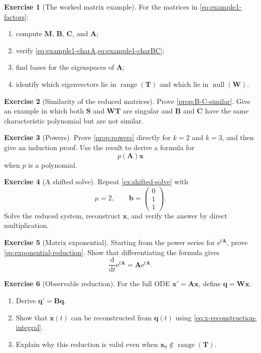 \documentclass[11pt]{article}
\newcommand{\mat}[1]{\mathbf{#1}}
\newcommand{\vect}[1]{\mathbf{#1}}
\newcommand{\range}{\operatorname{range}}
\newcommand{\nullsp}{\operatorname{null}}
\newcommand{\e}{\mathrm{e}}
\newcommand{\dd}{\mathrm{d}}
\theoremstyle{definition}
\newtheorem{exercise}{Exercise}[section]
\theoremstyle{remark}
\begin{document}
\begin{exercise}[The worked matrix example]
\label{ex:verify-worked}
For the matrices in \cref{eq:example1-factors}:
\begin{enumerate}[label=(\alph*)]
  \item compute \(\mat{M}\), \(\mat{B}\), \(\mat{C}\), and \(\mat{A}\);
  \item verify \cref{eq:example1-charA,eq:example1-charBC};
  \item find bases for the eigenspaces of \(\mat{A}\);
  \item identify which eigenvectors lie in \(\range(\mat{T})\) and which lie in \(\nullsp(\mat{W})\).
\end{enumerate}
\end{exercise}

\begin{exercise}[Similarity of the reduced matrices]
\label{ex:similarity}
Prove \cref{prop:B-C-similar}. Give an example in which both \(\mat{S}\) and \(\mat{W}\mat{T}\) are singular and \(\mat{B}\) and \(\mat{C}\) have the same characteristic polynomial but are not similar.
\end{exercise}

\begin{exercise}[Powers]
\label{ex:powers}
Prove \cref{prop:powers} directly for \(k=2\) and \(k=3\), and then give an induction proof. Use the result to derive a formula for
\[
  p(\mat{A})\vect{x}
\]
when \(p\) is a polynomial.
\end{exercise}

\begin{exercise}[A shifted solve]
\label{ex:shifted-solve-exercise}
Repeat \cref{ex:shifted-solve} with
\[
  \mu=2,
  \qquad
  \vect{b}=
  \begin{pmatrix}0\\1\\1\end{pmatrix}.
\]
Solve the reduced system, reconstruct \(\vect{x}\), and verify the answer by direct multiplication.
\end{exercise}

\begin{exercise}[Matrix exponential]
\label{ex:matrix-exponential}
Starting from the power series for \(\e^{t\mat{A}}\), prove \cref{eq:exponential-reduction}. Show that differentiating the formula gives
\[
  \frac{\dd}{\dd t}\e^{t\mat{A}}
  =\mat{A}\e^{t\mat{A}}.
\]
\end{exercise}

\begin{exercise}[Observable reduction]
\label{ex:observable-reduction}
For the full ODE \(\vect{x}'=\mat{A}\vect{x}\), define \(\vect{q}=\mat{W}\vect{x}\).
\begin{enumerate}[label=(\alph*)]
  \item Derive \(\vect{q}'=\mat{B}\vect{q}\).
  \item Show that \(\vect{x}(t)\) can be reconstructed from \(\vect{q}(t)\) using \cref{eq:x-reconstruction-integral}.
  \item Explain why this reduction is valid even when \(\vect{x}_0\notin\range(\mat{T})\).
\end{enumerate}
\end{exercise}
\end{document}
